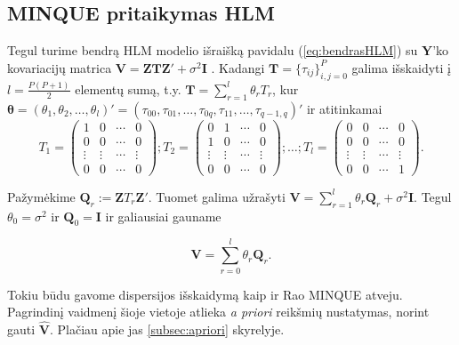 \documentclass[11pt,a4paper]{article}
\begin{document}
\subsection{MINQUE pritaikymas HLM}
Tegul turime bendrą HLM modelio išraišką pavidalu (\ref{eq:bendrasHLM}) su $\mathbf{Y}$'ko kovariacijų matrica $\mathbf{V}=\mathbf{ZTZ'}+\sigma^2\mathbf{I}$ . Kadangi $\mathbf{T}=\{\tau_{ij}\}^P_{i,j=0}$ galima išskaidyti į $l=\frac{P(P+1)}{2}$ elementų sumą, t.y.
$\mathbf{T}=\sum^l_{r=1}\theta_rT_r$, kur $\boldsymbol{\theta} = (\theta_1,\theta_2,\dots,\theta_l)'=(\tau_{00}, \tau_{01}, \dots, \tau_{0q}, \tau_{11},\dots, \tau_{q-1,q})'$ ir atitinkamai
\small
\[
T_1=
\begin{pmatrix}
1&0&\cdots&0 \\
0&0&\cdots&0 \\
\vdots&\vdots& \cdots &\vdots \\
0&0&\cdots&0
\end{pmatrix};
T_2=
\begin{pmatrix}
0&1&\cdots&0 \\
1&0&\cdots&0 \\
\vdots&\vdots& \cdots &\vdots \\
0&0&\cdots&0
\end{pmatrix};
\dots;
T_l=
\begin{pmatrix}
0&0&\cdots&0 \\
0&0&\cdots&0 \\
\vdots&\vdots& \cdots &\vdots \\
0&0&\cdots&1
\end{pmatrix}.
\]

Pažymėkime $\mathbf{Q}_r:= \mathbf{Z}T_r\mathbf{Z'}$. Tuomet galima užrašyti $\mathbf{V}=\sum^l_{r=1}\theta_r\mathbf{Q}_r+\sigma^2 \mathbf{I}$. Tegul $\theta_0 = \sigma^2$ ir $\mathbf{Q}_0=\mathbf{I}$ ir galiausiai gauname

\begin{equation*}
\mathbf{V}=\sum^l_{r=0} \theta_r\mathbf{Q}_r.
\end{equation*}

Tokiu būdu gavome dispersijos išskaidymą kaip ir Rao MINQUE atveju. Pagrindinį vaidmenį šioje vietoje atlieka \textit{a priori} reikšmių nustatymas, norint gauti $\mathbf{\hat{V}}$. Plačiau apie jas \ref{subsec:apriori} skyrelyje. 
\end{document}
